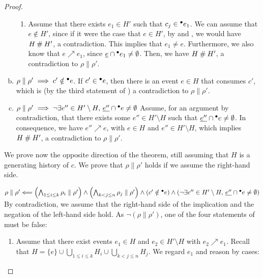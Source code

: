 \documentclass[12pt,a4paper]{article}
\newcommand{\confl}{\ensuremath\mathbin\#}
\begin{document}
\begin{proof}
\begin{enumerate}[(a)]
\begin{enumerate}[1.]
\item Assume that there exists $e_1 \in H'$ such that $c_j \in {}^\bullet e_1$. We
can assume that $e \notin H'$, since if it were the case that $e \in H'$, by
 and , we would have $H \confl H'$,
a contradiction.  This implies that $e_1 \ne e$.  Furthermore, we also know
that $e \nearrow e_1$, since $\underline{e} \cap {}^\bullet e_1 \ne \emptyset$.  Then, we
have $H \confl H'$, a contradiction to $\rho \parallel \rho'$.
\end{enumerate}

\item $\rho \parallel \rho' \implies c' \notin {}^\bullet e$.  If $c' \in {}^\bullet e$,
then there is an event $e \in H$ that consumes $c'$, which is (by the third
statement of ) a contradiction to $\rho \parallel \rho'$.

\item $\rho \parallel \rho' \implies \lnot \exists e'' \in H' \setminus
H,\, \underline{e''} \cap {}^\bullet e \ne \emptyset$  Assume, for an argument by
contradiction, that there exists some $e'' \in H' \setminus H$
such that $\underline{e''} \cap {}^\bullet e \ne \emptyset$.  In consequence, we have
$e'' \nearrow e$, with $e \in H$ and $e'' \in H' \setminus H$, which implies $H
\confl H'$, a contradiction to $\rho \parallel \rho'$.
\end{enumerate}

We prove now the opposite direction of the theorem, still assuming that $H$ is
a generating history of $c$.  We prove that $\rho \parallel \rho'$ holds if we
assume the right-hand side.

\item $\rho \parallel \rho' \Longleftarrow
\left ( \bigwedge_{1 \le i \le k} \rho_i \parallel \rho' \right ) \land 
\left ( \bigwedge_{k < j \le n} \rho_j \parallel \rho' \right ) \land 
\left ( c' \notin {}^\bullet e \right ) \land
\left ( \lnot \exists e'' \in H' \setminus H,\, \underline{e''} \cap {}^\bullet e \ne
\emptyset \right )$ By contradiction, we assume that the right-hand side of the
implication and the negation of the left-hand side hold.  As $\lnot (\rho
\parallel \rho')$, one of the four statements of  must be
false:

\begin{enumerate}[$i$.]
\item Assume that there exist events $e_1 \in H$ and $e_2 \in H' \setminus H$
with $e_2 \nearrow e_1$.  Recall that $H = \{e\} \cup \bigcup_{1 \le i \le k}
H_i \cup \bigcup_{k < j \le n} H_j$.  We regard $e_1$ and reason by cases:


\end{enumerate}
\end{proof}
\end{document}
